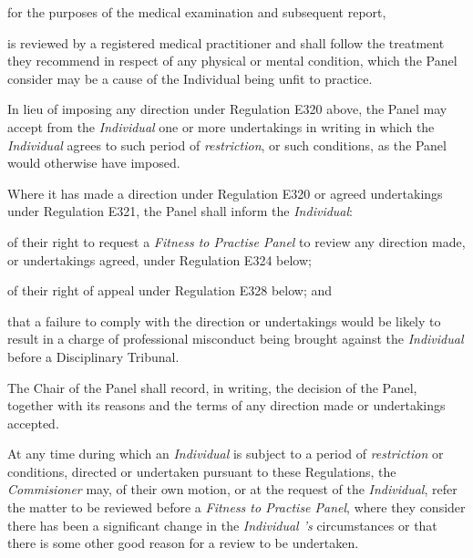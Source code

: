 for the purposes of the medical examination and subsequent report,\\
\item  is reviewed by a registered medical practitioner and shall follow the
treatment they recommend in respect of any physical or mental condition,
which the Panel consider may be a cause of the Individual being unfit to
practice.\la\ln
{}\par
In lieu of imposing any direction under Regulation E320 above, the Panel
may accept from the \emph{Individual} one or more undertakings in
writing in which the \emph{Individual} agrees to such period
of \emph{restriction}, or such conditions, as the Panel would otherwise
have imposed.\\
\par
Where it has made a direction under Regulation E320 or agreed
undertakings under Regulation E321, the Panel shall inform
the \emph{Individual}:\\\nl \item of their right to request a \emph{Fitness to Practise Panel} to
review any direction made, or undertakings agreed, under Regulation E324
below;\item of their right of appeal under Regulation E328 below; and\item that a failure to comply with the direction or undertakings would be
likely to result in a charge of professional misconduct being brought
against the \emph{Individual} before a Disciplinary Tribunal.\ln
{}\par
The Chair of the Panel shall record, in writing, the decision of the
Panel, together with its reasons and the terms of any direction made or
undertakings accepted.\\
\par
{}
At any time during which an \emph{Individual} is subject to a period
of \emph{restriction} or conditions, directed or undertaken pursuant to
these Regulations, the \emph{Commisioner} may, of their own motion, or
at the request of the \emph{Individual}, refer the matter to be reviewed
before a \emph{Fitness to Practise Panel}, where they consider there has
been a significant change in the \emph{Individual 's} circumstances or
that there is some other good reason for a review to be undertaken.\\
